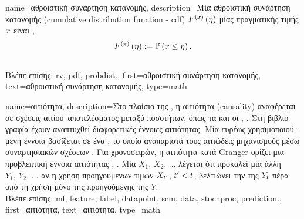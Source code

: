 {name={\foreignlanguage{greek}{αθροιστική συνάρτηση κατανομής}},
	description={\foreignlanguage{greek}{Μία αθροιστική συνάρτηση κατανομής} 
		(cumulative distribution function - cdf) $F^{(x)}\left(\eta\right)$ \foreignlanguage{greek}{μίας}  
		\foreignlanguage{greek}{πραγματικής τιμής $x$ είναι} \cite{AshProbMeasure}, \cite{papoulis}
		$$F^{(x)}\left(\eta\right) := \mathbb{P}\left(x \leq \eta\right).$$
					\\ 
		\foreignlanguage{greek}{Βλέπε επίσης:} \gls{rv}, \gls{pdf}, \gls{probdist}.},
	first={\foreignlanguage{greek}{αθροιστική συνάρτηση κατανομής}},
	text={\foreignlanguage{greek}{αθροιστική συνάρτηση κατανομής}},
	type=math
}

{name={\foreignlanguage{greek}{αιτιότητα}},
	description={\foreignlanguage{greek}{Στο πλαίσιο της} , \foreignlanguage{greek}{η 
		αιτιότητα} (causality) \foreignlanguage{greek}{αναφέρεται σε σχέσεις
		αιτίου–αποτελέσματος μεταξύ ποσοτήτων, όπως τα}  \foreignlanguage{greek}{και οι}  
		 \cite{Pearl:2010aa}, \cite{Thurman1988}. 
		\foreignlanguage{greek}{Στη βιβλιογραφία έχουν αναπτυχθεί διαφορετικές έννοιες αιτιότητας. Μία ευρέως χρησιμοποιούμενη 
		έννοια βασίζεται σε ένα} , \foreignlanguage{greek}{το οποίο αναπαριστά τους αιτιώδεις μηχανισμούς 
		μέσω συναρτησιακών σχέσεων} \cite{Pearl:2010aa}. 
		\foreignlanguage{greek}{Για}  \foreignlanguage{greek}{χρονοσειρών, η αιτιότητα κατά} Granger 
		\foreignlanguage{greek}{ορίζει μια προβλεπτική έννοια αιτιότητας} \cite{Deistler2022}, \cite{Granger1969}. 
		\foreignlanguage{greek}{Μία}  $X_{1},\,X_{2},\,\ldots$ \foreignlanguage{greek}{λέγεται ότι προκαλεί μία 
		άλλη}  $Y_{1},\,Y_{2},\,\ldots$ \foreignlanguage{greek}{αν η χρήση προηγούμενων τιμών 
		$X_{t'}$, $t' < t$, βελτιώνει την}  \foreignlanguage{greek}{της
		$Y_{t}$ πέρα από τη χρήση μόνο της προηγούμενης της} $Y$. 
		\\ 
		\foreignlanguage{greek}{Βλέπε επίσης:} \gls{ml}, \gls{feature}, \gls{label}, \gls{datapoint}, \gls{scm}, \gls{data}, \gls{stochproc}, \gls{prediction}.},
	first={\foreignlanguage{greek}{αιτιότητα}},
	text={\foreignlanguage{greek}{αιτιότητα}},
	type=math
}

